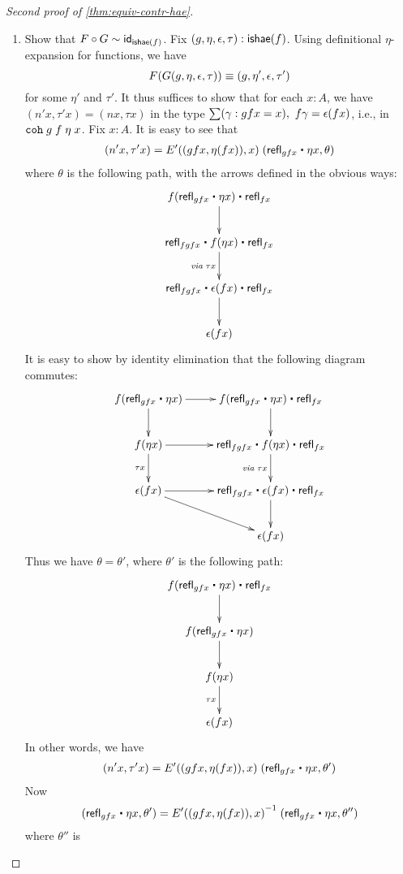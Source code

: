 \begin{proof}[Second proof of \autoref{thm:equiv-contr-hae}]
\begin{enumerate}
\item Show that $F \circ G \sim \idfunc[\ishae(f)]$.
  Fix $(g,\eta,\epsilon,\tau):\ishae(f)$.
  Using definitional $\eta$-expansion for functions, we have \[F(G(g,\eta,\epsilon,\tau)) \jdeq (g, \eta', \epsilon, \tau')\] for some $\eta'$ and $\tau'$.
  It thus suffices to show that for each $x : A$, we have $(n'x,\tau' x) = (nx,\tau x)$ in the type $\sm{\gamma : gfx = x} f\gamma = \epsilon(fx)$, i.e., in $\coh{g}{f}{\eta} \; x$. Fix $x : A$. It is easy to see that
\begin{align*}
(n'x,\tau' x) = E'((gfx, \eta(fx)),x) \; (\refl{gfx} \ct \eta x, \theta)
\end{align*}
where $\theta$ is the following path, with the arrows defined in the obvious ways:
\begin{align*}
\xymatrix{
f(\refl{gfx} \ct \eta x) \ct \refl{fx} \ar[d] \\
\refl{fgfx} \ct f(\eta x) \ct \refl{fx} \ar[d]_{\mathit{via \;}\tau x} \\
\refl{fgfx} \ct \epsilon (fx) \ct \refl{fx} \ar[d] \\
\epsilon (f x)}
\end{align*}
It is easy to show by identity elimination that the following diagram commutes:
\begin{align*}
\xymatrix{
f(\refl{gfx} \ct \eta x) \ar[r] \ar[d] & f(\refl{gfx} \ct \eta x) \ct \refl{fx} \ar[d] \\
f(\eta x) \ar[r] \ar[d]_{\tau x} & \refl{fgfx} \ct f(\eta x) \ct \refl{fx} \ar[d]_{\mathit{via \;}\tau x} \\
\epsilon (f x) \ar[r] \ar[rd] & \refl{fgfx} \ct \epsilon (fx) \ct \refl{fx} \ar[d] \\
& \epsilon (f x)}
\end{align*}
Thus we have $\theta = \theta'$, where $\theta'$ is the following path:
\begin{align*}
\xymatrix{
f(\refl{gfx} \ct \eta x) \ct \refl{fx} \ar[d] \\
f(\refl{gfx} \ct \eta x) \ar[d] \\
f(\eta x) \ar[d] _{\tau x} \\
\epsilon (f x)}
\end{align*}
In other words, we have  
\begin{align*}
(n'x,\tau' x) = E'((gfx, \eta(fx)),x) \; (\refl{gfx} \ct \eta x, \theta')
\end{align*}
Now \[(\refl{gfx} \ct \eta x, \theta') = \opp{E'((gfx, \eta(fx)),x)} \; (\refl{gfx} \ct \eta x, \theta'')\] where $\theta''$ is

\end{enumerate}
\end{proof}
